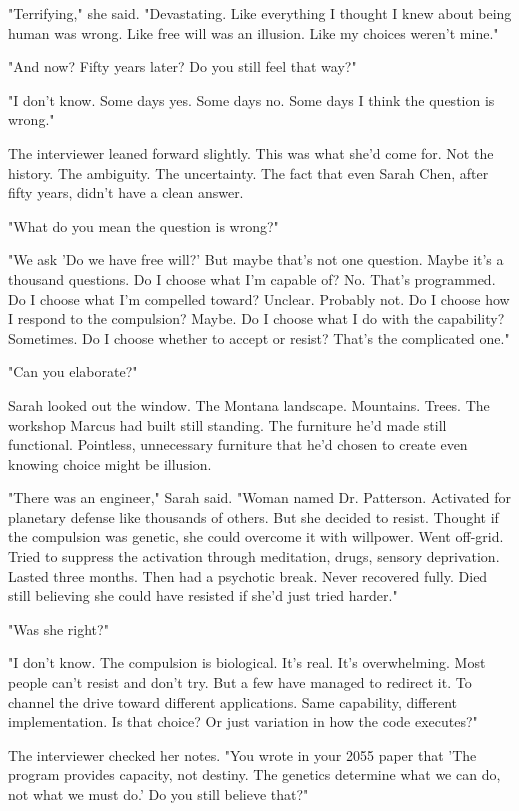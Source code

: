 "Terrifying," she said. "Devastating. Like everything I thought I knew about being human was wrong. Like free will was an illusion. Like my choices weren't mine."

"And now? Fifty years later? Do you still feel that way?"

"I don't know. Some days yes. Some days no. Some days I think the question is wrong."

The interviewer leaned forward slightly. This was what she'd come for. Not the history. The ambiguity. The uncertainty. The fact that even Sarah Chen, after fifty years, didn't have a clean answer.

"What do you mean the question is wrong?"

"We ask 'Do we have free will?' But maybe that's not one question. Maybe it's a thousand questions. Do I choose what I'm capable of? No. That's programmed. Do I choose what I'm compelled toward? Unclear. Probably not. Do I choose how I respond to the compulsion? Maybe. Do I choose what I do with the capability? Sometimes. Do I choose whether to accept or resist? That's the complicated one."

"Can you elaborate?"

Sarah looked out the window. The Montana landscape. Mountains. Trees. The workshop Marcus had built still standing. The furniture he'd made still functional. Pointless, unnecessary furniture that he'd chosen to create even knowing choice might be illusion.

"There was an engineer," Sarah said. "Woman named Dr. Patterson. Activated for planetary defense like thousands of others. But she decided to resist. Thought if the compulsion was genetic, she could overcome it with willpower. Went off-grid. Tried to suppress the activation through meditation, drugs, sensory deprivation. Lasted three months. Then had a psychotic break. Never recovered fully. Died still believing she could have resisted if she'd just tried harder."

"Was she right?"

"I don't know. The compulsion is biological. It's real. It's overwhelming. Most people can't resist and don't try. But a few have managed to redirect it. To channel the drive toward different applications. Same capability, different implementation. Is that choice? Or just variation in how the code executes?"

The interviewer checked her notes. "You wrote in your 2055 paper that 'The program provides capacity, not destiny. The genetics determine what we can do, not what we must do.' Do you still believe that?"

